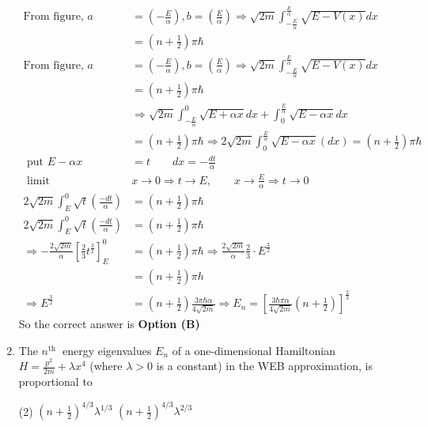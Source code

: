 \begin{enumerate}
\begin{answer}
\begin{align*}
\text{From figure, }a&=\left(-\frac{E}{\alpha}\right), b=\left(\frac{E}{\alpha}\right) \Rightarrow \sqrt{2 m} \int_{-\frac{E}{\alpha}}^{\frac{E}{\alpha}} \sqrt{E-V(x)} d x\\&=\left(n+\frac{1}{2}\right) \pi \hbar\\
\text{From figure, }a&=\left(-\frac{E}{\alpha}\right), b=\left(\frac{E}{\alpha}\right) \Rightarrow \sqrt{2 m} \int_{-\frac{E}{\alpha}}^{\frac{E}{\alpha}} \sqrt{E-V(x)} d x\\&=\left(n+\frac{1}{2}\right) \pi \hbar\\
&\Rightarrow \sqrt{2 m} \int_{-\frac{E}{\alpha}}^{0} \sqrt{E+\alpha x} d x+\int_{0}^{\frac{E}{\alpha}} \sqrt{E-\alpha x} d x\\&=\left(n+\frac{1}{2}\right) \pi \hbar \Rightarrow 2 \sqrt{2 m} \int_{0}^{\frac{E}{\alpha}} \sqrt{E-\alpha x}(d x)=\left(n+\frac{1}{2}\right) \pi \hbar\\
\text{	put }E-\alpha x&=t\quad\quad
d x=-\frac{d t}{\alpha}\\
\text{	limit }&x \rightarrow 0 \Rightarrow t \rightarrow E, \quad \quad x \rightarrow \frac{E}{\alpha} \Rightarrow t \rightarrow 0\\
2 \sqrt{2 m} \int_{E}^{0} \sqrt{t}\left(\frac{-d t}{\alpha}\right)&=\left(n+\frac{1}{2}\right) \pi \hbar\\
2 \sqrt{2 m} \int_{E}^{0} \sqrt{t}\left(\frac{-d t}{\alpha}\right)&=\left(n+\frac{1}{2}\right) \pi \hbar\\
\Rightarrow-\frac{2 \sqrt{2 m}}{\alpha}\left[\frac{2}{3} t^{\frac{3}{2}}\right]_{E}^{0}&=\left(n+\frac{1}{2}\right) \pi \hbar \Rightarrow \frac{2 \sqrt{2 m}}{\alpha} \frac{2}{3} \cdot E^{\frac{3}{2}}\\&=\left(n+\frac{1}{2}\right) \pi h\\
\Rightarrow E^{\frac{3}{2}}&=\left(n+\frac{1}{2}\right) \frac{3 \pi \hbar \alpha}{4 \sqrt{2 m}} \Rightarrow E_{n}=\left[\frac{3 \hbar \pi \alpha}{4 \sqrt{2 m}}\left(n+\frac{1}{2}\right)\right]^{\frac{2}{3}}
\end{align*}
So the correct answer is \textbf{Option (B)}
\end{answer}
\item 	The $n^{\text {th }}$ energy eigenvalues $E_{n}$ of a one-dimensional Hamiltonian $H=\frac{p^{2}}{2 m}+\lambda x^{4}$ (where $\lambda>0$ is a constant) in the WEB approximation, is proportional to
{}
\begin{tasks}(2)
\task[\textbf{A.}] $\left(n+\frac{1}{2}\right)^{4 / 3} \lambda^{1 / 3}$
\task[\textbf{B.}] $\left(n+\frac{1}{2}\right)^{4 / 3} \lambda^{2 / 3}$

\end{tasks}
\end{enumerate}

